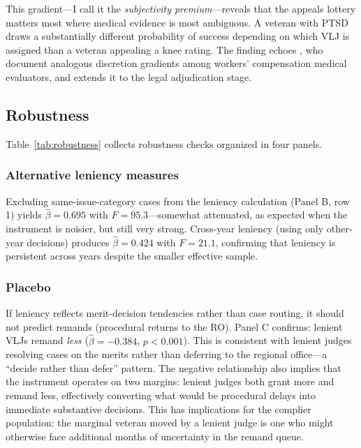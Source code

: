 \documentclass[12pt]{article}
\begin{document}
This gradient---I call it the \textit{subjectivity premium}---reveals that the appeals lottery matters most where medical evidence is most ambiguous. A veteran with PTSD draws a substantially different probability of success depending on which VLJ is assigned than a veteran appealing a knee rating. The finding echoes \citet{cabral2025}, who document analogous discretion gradients among workers' compensation medical evaluators, and extends it to the legal adjudication stage.


\subsection{Robustness}

Table~\ref{tab:robustness} collects robustness checks organized in four panels.



\subsubsection*{Alternative leniency measures} Excluding same-issue-category cases from the leniency calculation (Panel B, row 1) yields $\hat{\beta} = 0.695$ with $F = 95.3$---somewhat attenuated, as expected when the instrument is noisier, but still very strong. Cross-year leniency (using only other-year decisions) produces $\hat{\beta} = 0.424$ with $F = 21.1$, confirming that leniency is persistent across years despite the smaller effective sample.

\subsubsection*{Placebo} If leniency reflects merit-decision tendencies rather than case routing, it should not predict remands (procedural returns to the RO). Panel C confirms: lenient VLJs remand \textit{less} ($\hat{\beta} = -0.384$, $p < 0.001$). This is consistent with lenient judges resolving cases on the merits rather than deferring to the regional office---a ``decide rather than defer'' pattern. The negative relationship also implies that the instrument operates on two margins: lenient judges both grant more and remand less, effectively converting what would be procedural delays into immediate substantive decisions. This has implications for the complier population: the marginal veteran moved by a lenient judge is one who might otherwise face additional months of uncertainty in the remand queue.
\end{document}
